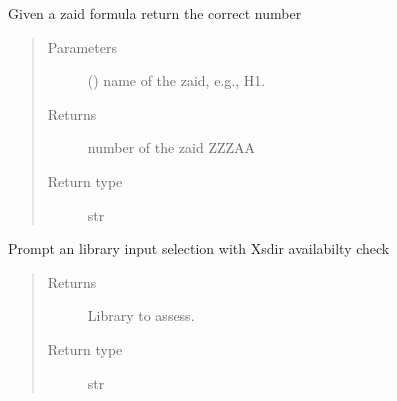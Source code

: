 \documentclass[letterpaper,10pt,english]{sphinxmanual}
\begin{document}
\begin{fulllineitems}
\begin{fulllineitems}
\begin{quote}
\begin{description}
\begin{itemize}
\end{itemize}


\end{description}\end{quote}

\end{fulllineitems}


\begin{fulllineitems}
\label{\detokenize{api/initobjects:libmanager.LibManager.get_zaidnum}}
\sphinxAtStartPar
Given a zaid formula return the correct number
\begin{quote}\begin{description}
\item[{Parameters}] \leavevmode
\sphinxAtStartPar
{} () \textendash{} name of the zaid, e.g., H1.

\item[{Returns}] \leavevmode
\sphinxAtStartPar
{} \textendash{} number of the zaid ZZZAA

\item[{Return type}] \leavevmode
\sphinxAtStartPar
str

\end{description}\end{quote}

\end{fulllineitems}


\begin{fulllineitems}
\label{\detokenize{api/initobjects:libmanager.LibManager.select_lib}}
\sphinxAtStartPar
Prompt an library input selection with Xsdir availabilty check
\begin{quote}\begin{description}
\item[{Returns}] \leavevmode
\sphinxAtStartPar
{} \textendash{} Library to assess.

\item[{Return type}] \leavevmode
\sphinxAtStartPar
str

\end{description}\end{quote}

\end{fulllineitems}


\end{fulllineitems}
\end{document}
